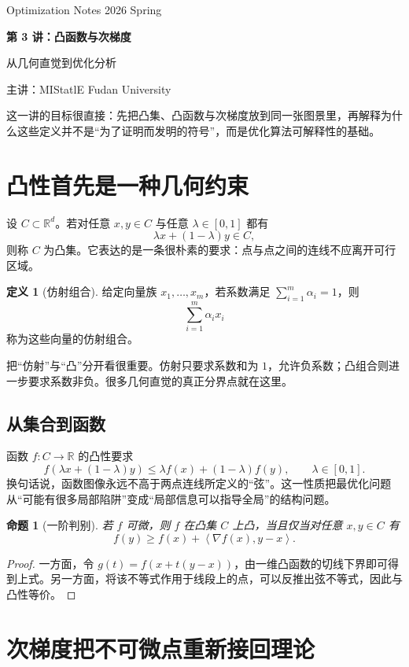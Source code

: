 \documentclass[11pt]{article}
\newcounter{lecnum}
\numberwithin{equation}{section}
\newcommand{\LectureAffiliation}{Fudan University}
\newcommand{\LectureBanner}[6]{%
  \setcounter{lecnum}{#1}%
  \setcounter{page}{1}%
  \setcounter{section}{0}%
  \setcounter{equation}{0}%
  \markright{#2}%
  \begin{tcolorbox}[
    cn-panel,
    colback=white,
    colframe=brandD!35!white,
    borderline west={4pt}{0pt}{accent}
  ]
    {\sffamily\small\color{ink!60} #4 \hfill #5}\par
    \vspace{0.35em}
    {\bfseries\fontsize{22}{26}\selectfont\color{keydark} 第 #1 讲：#2\par}
    \vspace{0.2em}
    {\large\color{brand} #3\par}
    \vspace{0.7em}
    {\small\sffamily\color{ink!72} 主讲：#6 \hfill {\color{brandD}\LectureAffiliation}}
  \end{tcolorbox}
  \vspace{0.7em}
}
\theoremstyle{plain}
\newtheorem{proposition}[theorem]{命题}
\theoremstyle{definition}
\newtheorem{definition}[theorem]{定义}
\theoremstyle{remark}
\newcommand{\R}{\mathbb{R}}
\newcommand{\ip}[2]{\left\langle #1, #2 \right\rangle}
\begin{document}
\LectureBanner
  {3}
  {凸函数与次梯度}
  {从几何直觉到优化分析}
  {Optimization Notes}
  {2026 Spring}
  {MIStatlE}

\begin{SummaryBox}
这一讲的目标很直接：先把凸集、凸函数与次梯度放到同一张图景里，再解释为什么这些定义并不是“为了证明而发明的符号”，而是优化算法可解释性的基础。
\end{SummaryBox}

\section{凸性首先是一种几何约束}

设 $C \subset \R^d$。若对任意 $x,y \in C$ 与任意 $\lambda \in [0,1]$ 都有
\[
\lambda x + (1-\lambda)y \in C,
\]
则称 $C$ 为凸集。它表达的是一条很朴素的要求：点与点之间的连线不应离开可行区域。

\begin{definition}[仿射组合]
给定向量族 $x_1,\dots,x_m$，若系数满足 $\sum_{i=1}^m \alpha_i = 1$，则
\[
\sum_{i=1}^m \alpha_i x_i
\]
称为这些向量的仿射组合。
\end{definition}

\begin{AnalysisBox}
把“仿射”与“凸”分开看很重要。仿射只要求系数和为 $1$，允许负系数；凸组合则进一步要求系数非负。很多几何直觉的真正分界点就在这里。
\end{AnalysisBox}

\subsection{从集合到函数}

函数 $f:C\to \R$ 的凸性要求
\[
f(\lambda x+(1-\lambda)y) \le \lambda f(x)+(1-\lambda)f(y), \qquad \lambda\in[0,1].
\]
换句话说，函数图像永远不高于两点连线所定义的“弦”。这一性质把最优化问题从“可能有很多局部陷阱”变成“局部信息可以指导全局”的结构问题。

\begin{proposition}[一阶判别]
若 $f$ 可微，则 $f$ 在凸集 $C$ 上凸，当且仅当对任意 $x,y\in C$ 有
\[
f(y)\ge f(x) + \ip{\nabla f(x)}{y-x}.
\]
\end{proposition}

\begin{proof}
一方面，令 $g(t)=f(x+t(y-x))$，由一维凸函数的切线下界即可得到上式。另一方面，将该不等式作用于线段上的点，可以反推出弦不等式，因此与凸性等价。
\end{proof}

\section{次梯度把不可微点重新接回理论}
\end{document}
